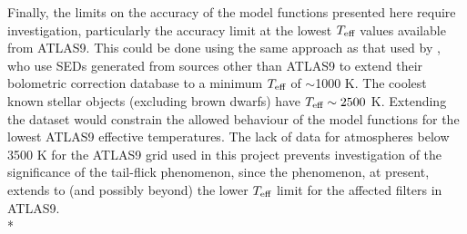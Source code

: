 \documentclass[12pt, a4paper]{report}
\begin{document}
Finally, the limits on the accuracy of the model functions presented here require investigation, particularly the accuracy limit at the lowest $T_{\textnormal{eff}}$ values available from ATLAS9. This could be done using the same approach as that used by \cite{2008PASP..120..583G}, who use SEDs generated from sources other than ATLAS9 to extend their bolometric correction database to a minimum $T_{\textnormal{eff}}$ of $\sim$1000 K. The coolest known stellar objects (excluding brown dwarfs) have $T_{\textnormal{eff}} \sim 2500$ K. Extending the dataset would constrain the allowed behaviour of the model functions for the lowest ATLAS9 effective temperatures. The lack of data for atmospheres below 3500 K for the ATLAS9 grid used in this project prevents investigation of the significance of the tail-flick phenomenon, since the phenomenon, at present, extends to (and possibly beyond) the lower $T_{\textnormal{eff}}$ limit for the affected filters in ATLAS9.\\*

%

\end{document}
